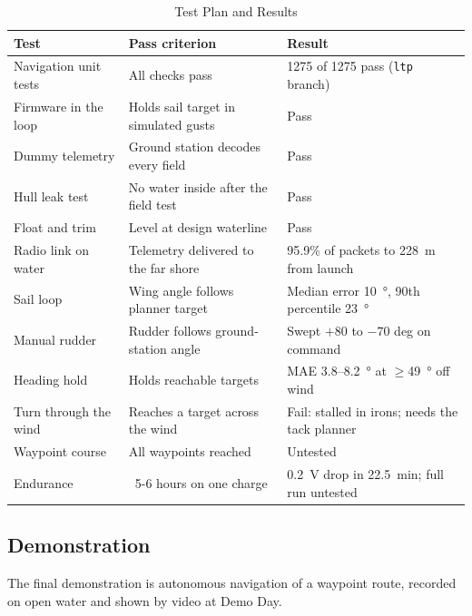 \begin{table}[!t]
\caption{Test Plan and Results}
\label{tab:tests}
\centering
\footnotesize
\begin{tabular}{@{}p{}p{}p{}@{}}
\toprule
Test & Pass criterion & Result \\
\midrule
Navigation unit tests & All checks pass & 1275 of 1275 pass (\texttt{ltp} branch) \\
Firmware in the loop & Holds sail target in simulated gusts & Pass \\
Dummy telemetry & Ground station decodes every field & Pass \\
Hull leak test & No water inside after the field test & Pass \\
Float and trim & Level at design waterline & Pass \\
Radio link on water & Telemetry delivered to the far shore & 95.9\% of packets to \SI{228}{\meter} from launch \\
Sail loop & Wing angle follows planner target & Median error \SI{10}{\degree}, 90th percentile \SI{23}{\degree} \\
Manual rudder & Rudder follows ground-station angle & Swept $+80$ to $-70$ deg on command \\
Heading hold & Holds reachable targets & MAE 3.8--\SI{8.2}{\degree} at $\geq$\SI{49}{\degree} off wind \\
Turn through the wind & Reaches a target across the wind & Fail: stalled in irons; needs the tack planner \\
Waypoint course & All waypoints reached & Untested \\
Endurance & ~5-6 hours on one charge & \SI{0.2}{\volt} drop in \SI{22.5}{\minute}; full run untested \\
\bottomrule
\end{tabular}
\end{table}

\subsection{Demonstration}
The final demonstration is autonomous navigation of a waypoint route,
recorded on open water and shown by video at Demo Day.
